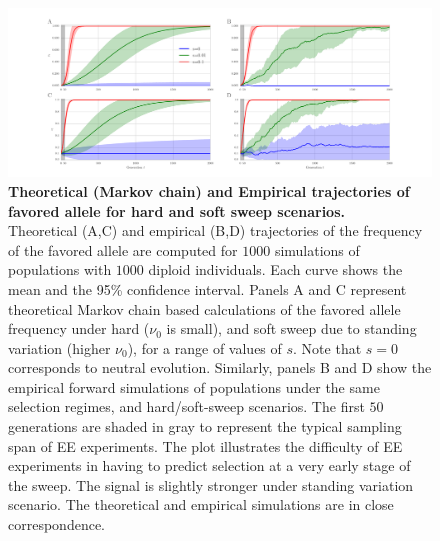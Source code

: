 \begin{figure}[H]
	\includegraphics[trim=1in 0.1in 1in 
	0.1in,clip,width=\textwidth]{AF.pdf}
	\caption{{\bf Theoretical (Markov chain) and Empirical
            trajectories of favored allele for hard and soft sweep
            scenarios.}\\  Theoretical (A,C) and empirical (B,D) trajectories 
            of 
            the
          frequency of the favored allele are computed for $1000$ 
          simulations of populations with 
          $1000$ diploid individuals. Each curve shows the mean and the 95\% 
          confidence
          interval.  Panels A and C represent theoretical Markov chain
          based calculations of the favored allele frequency under
          hard ($\nu_0$ is small), and soft sweep due to standing
          variation (higher $\nu_0$), for a range of values of
          $s$. Note that $s=0$ corresponds to neutral
          evolution. Similarly, panels B and D show the empirical
          forward simulations of populations under the same selection
          regimes, and hard/soft-sweep scenarios. The first $50$
          generations are shaded in gray to represent the typical
          sampling span of EE experiments. The plot illustrates the
          difficulty of EE experiments in having to predict selection
          at a very early stage of the sweep. The signal is slightly
          stronger under standing variation scenario. The theoretical
          and empirical simulations are in close correspondence. }
	\label{fig:sweep}
\end{figure}




